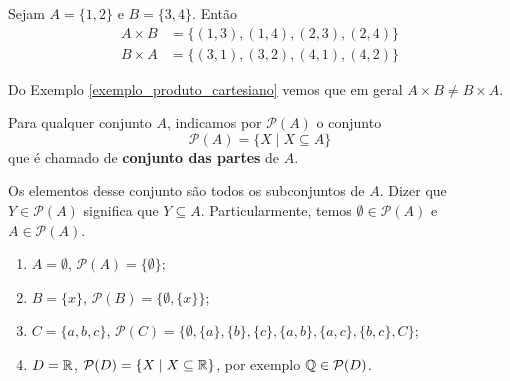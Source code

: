 \begin{exemplo}\label{exemplo_produto_cartesiano}
	Sejam $A = \{1,2\}$ e $B = \{3,4\}$. Ent\~ao
	\begin{align*}
		A \times B &= \{(1,3), (1,4), (2,3), (2,4)\}\\
		B \times A &= \{(3,1), (3,2), (4,1), (4,2)\}
\end{align*}
\end{exemplo}

\begin{observacao}
	Do Exemplo \eqref{exemplo_produto_cartesiano} vemos que em geral $A \times B \neq B\times A$.
\end{observacao}

\begin{definicao}
	Para qualquer conjunto $A$, indicamos por $\mathcal{P}(A)$ o conjunto
	\[
		\mathcal{P}(A) = \{ X \mid X\subseteq A\}
	\]
	que \'e chamado de \textbf{conjunto das partes} de $A$.
\end{definicao}

Os elementos desse conjunto s{\~a}o todos os subconjuntos de $A$. Dizer que $Y\in \mathcal{P}(A)$ significa que $Y \subseteq A$. Particularmente, temos $\emptyset\in \mathcal{P}(A)$ e $A\in \mathcal{P}(A)$.

\begin{exemplos}
	\begin{enumerate}[label={\arabic*})]
		\item $A = \emptyset$, $\mathcal{P}(A) = \{\emptyset\}$;
		\item $B = \{x\}$, $\mathcal{P}(B) = \{\emptyset, \{x\}\}$;
		\item $C = \{a,b,c\}$, $\mathcal{P}(C)=\{\emptyset, \{a\}, \{b\},\{c\},\{a,b\},\{a,c\},\{b,c\},C\}$;
		\item $D=\mathbb{R}$, $\mathcal{P}(D)=\{X\mid X \subseteq \mathbb{R}\}$, por exemplo $\mathbb{Q}\in \mathcal{P}(D)$.
	\end{enumerate}	
\end{exemplos}